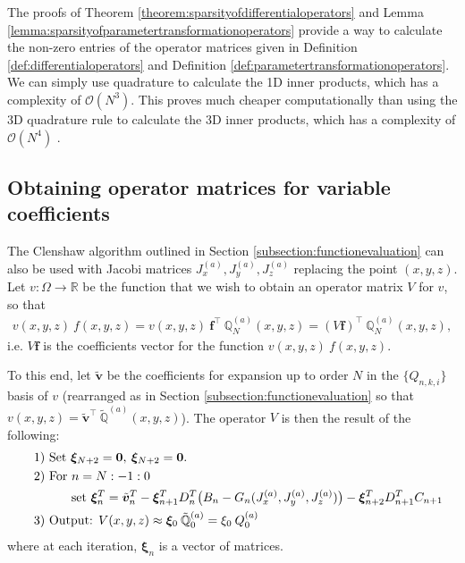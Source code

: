 \documentclass[11pt, oneside]{article}   	%
\newcommand{\bstodoinline}{\todo[color=pink,inline=true]}
\newcommand{\bigO}{\mathcal{O}}
\newcommand{\R}{\mathbb{R}}
\newcommand{\scop}{Q}
\newcommand{\scopnki}{\scop_{n,k,i}}
\newcommand{\scopa}{\scop^{(a)}}
\newcommand{\bigscop}{{\mathbb{Q}}}
\newcommand{\bigscopa}{\bigscop^{(a)}}
\newcommand{\bigscopNa}{\bigscopa_{N}}
\newcommand{\bigscopt}{\mathbb{\tilde{Q}}}
\newcommand{\bigscopta}{\bigscopt^{(a)}}
\begin{document}
The proofs of Theorem \ref{theorem:sparsityofdifferentialoperators} and Lemma \ref{lemma:sparsityofparametertransformationoperators} provide a way to calculate the non-zero entries of the operator matrices given in Definition \ref{def:differentialoperators} and Definition \ref{def:parametertransformationoperators}. We can simply use quadrature to calculate the 1D inner products, which has a complexity of $\bigO(N^3)$. This proves much cheaper computationally than using the 3D quadrature rule to calculate the 3D inner products, which has a complexity of $\bigO(N^4)$ \bstodoinline{correct the O(nd) complexity}. 


\subsection{Obtaining operator matrices for variable coefficients}\label{subsection:operatorclenshaw}

The Clenshaw algorithm outlined in Section \ref{subsection:functionevaluation} can also be used with Jacobi matrices $J^{(a)}_x, J^{(a)}_y, J^{(a)}_z$ replacing the point $(x,y,z)$. Let $v : \Omega \to \R$ be the function that we wish to obtain an operator matrix $V$ for $v$, so that
\begin{align*}
	v(x,y,z) \: f(x,y,z) = v(x,y,z) \: \bm{f}^\top \: \bigscopNa(x,y,z) = (V \bm{f})^\top \: \bigscopNa(x,y,z),
\end{align*}
i.e. $V \bm{f}$ is the coefficients vector for the function $v(x,y,z) \: f(x,y,z)$. 

To this end, let $\tilde{\bm{v}}$ be the coefficients for expansion up to order $N$ in the $\{\scopnki\}$ basis of $v$ (rearranged as in Section \ref{subsection:functionevaluation} so that $v(x,y,z) = \tilde{\bm{v}}^\top \: \bigscopta(x,y,z)$). The operator $V$ is then the result of the following:
\begin{align*}
	\quad &\text{1) } \text{Set } \bm{\xi}_{N+2} = \bold{0}, \: \bm{\xi}_{N+2} = \bold{0}. \\
	\quad &\text{2) } \text{For } n = N:-1:0 \\
	\quad & \quad \quad \quad \text{set } \bm{\xi}_{n}^T = {\tilde{\bm{v}}_n}^T - \bm{\xi}_{n+1}^T D^T_n \big(B_n - G_n(J^{(a)}_x, J^{(a)}_y, J^{(a)}_z)\big) -  \bm{\xi}_{n+2}^T D^T_{n+1}C_{n+1} \\
	\quad &\text{3) } \text{Output: } V(x,y,z) \approx \bm{\xi}_{0} \: \bigscopta_{0}  = \xi_{0} \: \scopa_0
\end{align*}
where at each iteration, $\bm{\xi}_n$ is a vector of matrices.
\end{document}
